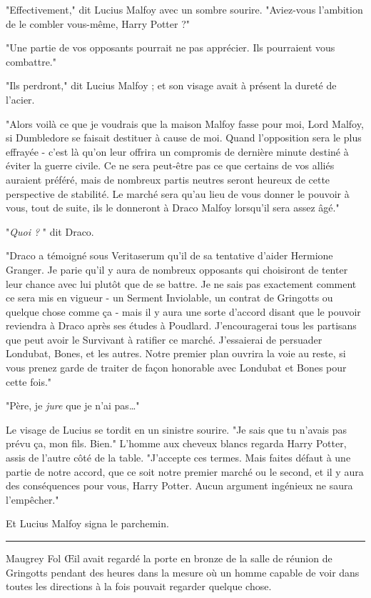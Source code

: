 "Effectivement," dit Lucius Malfoy avec un sombre sourire. "Aviez-vous l'ambition de le combler vous-même, Harry Potter ?"

"Une partie de vos opposants pourrait ne pas apprécier. Ils pourraient vous combattre."

"Ils perdront," dit Lucius Malfoy ; et son visage avait à présent la dureté de l'acier.

"Alors voilà ce que je voudrais que la maison Malfoy fasse pour moi, Lord Malfoy, si Dumbledore se faisait destituer à cause de moi. Quand l'opposition sera le plus effrayée - c'est là qu'on leur offrira un compromis de dernière minute destiné à éviter la guerre civile. Ce ne sera peut-être pas ce que certains de vos alliés auraient préféré, mais de nombreux partis neutres seront heureux de cette perspective de stabilité. Le marché sera qu'au lieu de vous donner le pouvoir à vous, tout de suite, ils le donneront à Draco Malfoy lorsqu'il sera assez âgé."

"\emph{Quoi ?} " dit Draco.

"Draco a témoigné sous Veritaserum qu'il de sa tentative d'aider Hermione Granger. Je parie qu'il y aura de nombreux opposants qui choisiront de tenter leur chance avec lui plutôt que de se battre. Je ne sais pas exactement comment ce sera mis en vigueur - un Serment Inviolable, un contrat de Gringotts ou quelque chose comme ça - mais il y aura une sorte d'accord disant que le pouvoir reviendra à Draco après ses études à Poudlard. J'encouragerai tous les partisans que peut avoir le Survivant à ratifier ce marché. J'essaierai de persuader Londubat, Bones, et les autres. Notre premier plan ouvrira la voie au reste, si vous prenez garde de traiter de façon honorable avec Londubat et Bones pour cette fois."

"Père, je \emph{jure}  que je n'ai pas…"

Le visage de Lucius se tordit en un sinistre sourire. "Je sais que tu n'avais pas prévu ça, mon fils. Bien." L'homme aux cheveux blancs regarda Harry Potter, assis de l'autre côté de la table. "J'accepte ces termes. Mais faites défaut à une partie de notre accord, que ce soit notre premier marché ou le second, et il y aura des conséquences pour vous, Harry Potter. Aucun argument ingénieux ne saura l'empêcher."

Et Lucius Malfoy signa le parchemin.
\par\noindent\rule{\textwidth}{0.4pt}
Maugrey Fol Œil avait regardé la porte en bronze de la salle de réunion de Gringotts pendant des heures dans la mesure où un homme capable de voir dans toutes les directions à la fois pouvait regarder quelque chose.

